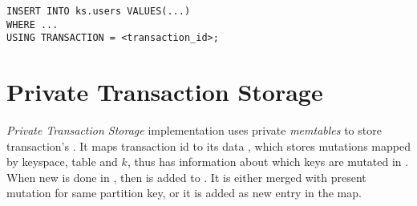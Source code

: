 






\begin{lstlisting}[style=outcode,label={lst:insertUsingTx},caption={Insert statement with using transactional clause}]
INSERT INTO ks.users VALUES(...) 
WHERE ...
USING TRANSACTION = <transaction_id>;
\end{lstlisting}


\section{Private Transaction Storage}
\emph{Private Transaction Storage} implementation uses private \emph{memtables} to store transaction's \mutations. It maps transaction id to its data , which stores mutations mapped by keyspace, table and $k$, thus \txStorage has information about which keys are mutated in \transaction. 
When new  is done in \transaction, then  is added to . 
It is either merged with present mutation for same partition key, or it is added as new entry in the map.


